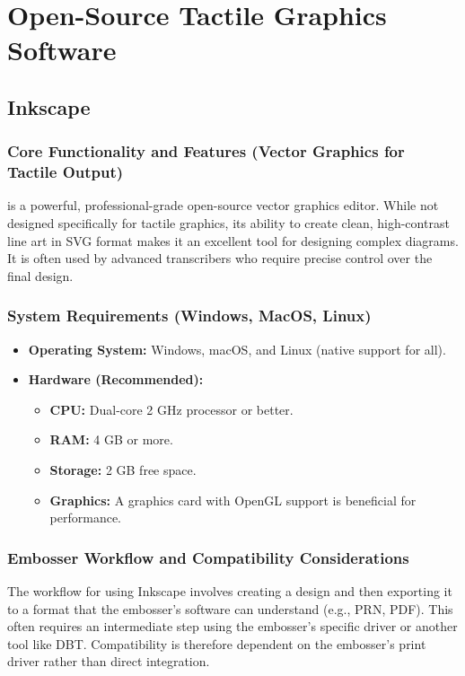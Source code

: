 \section{Open-Source Tactile Graphics Software}\label{ch14:sec:open-source-software}
\subsection{Inkscape}\label{ch14:ssec:inkscape}
\subsubsection{Core Functionality and Features (Vector Graphics for Tactile Output)}\label{ch14:sssec:inkscape-features}
 is a powerful, professional-grade open-source vector graphics editor. While not designed specifically for tactile graphics, its ability to create clean, high-contrast line art in SVG format makes it an excellent tool for designing complex diagrams. It is often used by advanced transcribers who require precise control over the final design.

\subsubsection{System Requirements (Windows, MacOS, Linux)}\label{ch14:sssec:inkscape-sysreq}
\begin{itemize}
	\item \textbf{Operating System:} Windows, macOS, and Linux (native support for all).
	\item \textbf{Hardware (Recommended):}
	      \begin{itemize}
		      \item \textbf{CPU:} Dual-core 2 GHz processor or better.
		      \item \textbf{RAM:} 4 GB or more.
		      \item \textbf{Storage:} 2 GB free space.
		      \item \textbf{Graphics:} A graphics card with OpenGL support is beneficial for performance.
	      \end{itemize}
\end{itemize}

\subsubsection{Embosser Workflow and Compatibility Considerations}\label{ch14:sssec:inkscape-compat}
The workflow for using Inkscape involves creating a design and then exporting it to a format that the embosser's software can understand (e.g., PRN, PDF). This often requires an intermediate step using the embosser's specific driver or another tool like DBT. Compatibility is therefore dependent on the embosser's print driver rather than direct integration.

